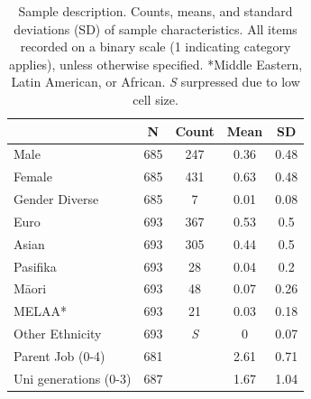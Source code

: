 \begin{table}[ht]
\centering

\begin{tabular}{lcccc}
\hline
                                                             & N   & Count & Mean & SD   \\ \hline
Male                                                         & 685 & 247 & 0.36 & 0.48 \\
Female                                                       & 685 & 431 & 0.63 & 0.48 \\
Gender Diverse                                               & 685 & 7 & 0.01 & 0.08 \\
Euro                                                         & 693 & 367 & 0.53 & 0.5  \\
Asian                                                        & 693 & 305 & 0.44 & 0.5  \\
Pasifika                                                      & 693 & 28 & 0.04 & 0.2  \\
M\={a}ori                                                        & 693 & 48 & 0.07 & 0.26 \\
MELAA*                                                        & 693 & 21 & 0.03 & 0.18 \\
Other Ethnicity                                               & 693 & \textit{S} & 0  & 0.07 \\
Parent Job  (0-4) &  681 & & 2.61 & 0.71 \\
Uni generations (0-3)                                        & 687 & & 1.67 & 1.04 \\ \hline
\end{tabular}
\caption{Sample description. Counts, means, and standard deviations (SD) of sample characteristics. All items recorded on a binary scale (1 indicating category applies), unless otherwise specified. *Middle Eastern, Latin American, or African. \textit{S} surpressed due to low cell size.} 
\label{tab:Sample}       %
\end{table}

